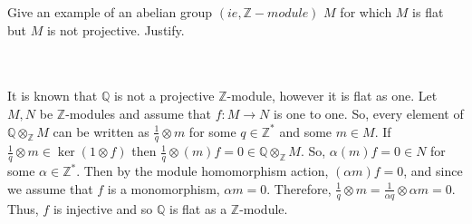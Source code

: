 Give an example of an abelian group $(ie, \mathbb{Z}-module)$ $M$ for which $M$ is flat but $M$ is not
projective. Justify.\\\\

\begin{solution}\renewcommand{\qedsymbol}{}\ \\

    It is known that $\mathbb{Q}$ is not a projective $\mathbb{Z}$-module, however it is flat as one.
    Let $M,N$ be $\mathbb{Z}$-modules and assume that $f:M\to N$ is one to one. So, every element of
    $\mathbb{Q}\otimes_{\mathbb{Z}}M$ can be written as $\frac1q\otimes m$ for some $q\in\mathbb{Z}^*$
    and some $m\in M$. If $\frac1q\otimes m\in\ker(1\otimes f)$ then
    $\frac1q\otimes(m)f=0\in\mathbb{Q}\otimes_{\mathbb{Z}}M$. So, $\alpha(m)f=0\in N$ for some
    $\alpha\in\mathbb{Z}^*$. Then by the module homomorphism action, $(\alpha m)f=0$, and since we
    assume that $f$ is a monomorphism, $\alpha m=0$. Therefore,
    $\frac1q\otimes m=\frac{1}{\alpha q}\otimes \alpha m=0$. Thus, $f$ is injective and so $\mathbb{Q}$
    is flat as a $\mathbb{Z}$-module.

\end{solution}